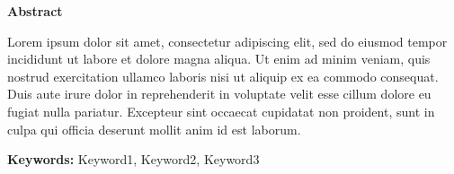 \documentclass[12pt,a4paper,twoside]{article}
\date{}
\makeatletter
\def\author#1{\gdef\@author{\hskip-\dimexpr(\tabcolsep)\hskip1pt\parbox{\dimexpr\textwidth-1pt}{\centering #1}}}
\let\@articletype\@empty \def\articletype#1{\gdef\@articletype{{\fontsize{14}{16}\selectfont #1}}}
\def\title#1{%
  \gdef\@title{%
    \ifx\@articletype\@empty\else\@articletype~\\\fi%
     #1}%
}
\def\abstractname{\textbf{Abstract}}
\renewenvironment{onecolabstract}
{\vspace*{-.4pc}\trivlist\item[]\leftskip1pt\noindent\selectfont\hfill\abstractname\hfill\mbox{\null}\par\ignorespaces}{\endtrivlist}
\makeatother
\begin{document}
\title{Preparation of papers for Mary Ann Liebert Inc. Soft Robotics Journal}
\def\RunningHead{
Preparation of papers short title
}
\def\RunningAuthor{smith \etal}
\author{John Smith and Bernard D. Researcher
\thanks{John Smith and Bernard D. Researcher are with Faculty of Electrical Engineering, Mathematics and Computer Science,
        University of Twente, 7500 AE Enschede, The Netherlands
        {\tt\small john.smith@email.com, b.d.researcher@email.org}}%
}

\maketitle



{\begin{onecolabstract}
Lorem ipsum dolor sit amet, consectetur adipiscing elit, sed do eiusmod tempor incididunt ut labore et dolore magna aliqua. Ut enim ad minim veniam, quis nostrud exercitation ullamco laboris nisi ut aliquip ex ea commodo consequat. Duis aute irure dolor in reprehenderit in voluptate velit esse cillum dolore eu fugiat nulla pariatur. Excepteur sint occaecat cupidatat non proident, sunt in culpa qui officia deserunt mollit anim id est laborum.

\def\keywordstitle{Keywords}
\smallskip\noindent\textbf{Keywords: }{\normalfont
Keyword1, Keyword2, Keyword3
}
\end{onecolabstract}}
 
\end{document}
